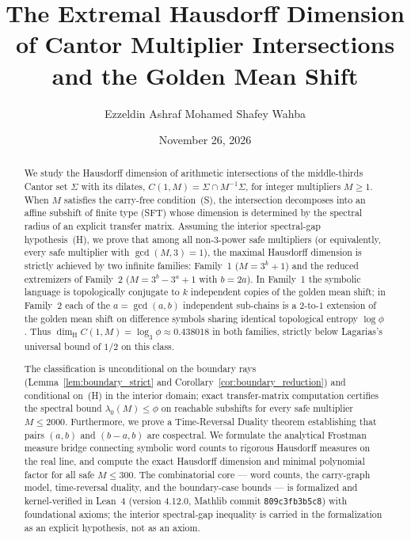 \documentclass[11pt,reqno]{amsart}
\title[Extremal Hausdorff Dimension of Cantor Multipliers]{The Extremal Hausdorff Dimension of Cantor Multiplier Intersections and the Golden Mean Shift}
\author{Ezzeldin Ashraf Mohamed Shafey Wahba}
\date{November 26, 2026}
\theoremstyle{plain}
\theoremstyle{definition}
\theoremstyle{remark}
\newcommand{\dimH}{\dim_{\mathrm{H}}}
\begin{document}
\begin{abstract}
We study the Hausdorff dimension of arithmetic intersections of the middle-thirds Cantor set $\Sigma$ with its dilates, $C(1, M) = \Sigma \cap M^{-1} \Sigma$, for integer multipliers $M \ge 1$. When $M$ satisfies the carry-free condition~(S), the intersection decomposes into an affine subshift of finite type (SFT) whose dimension is determined by the spectral radius of an explicit transfer matrix. Assuming the interior spectral-gap hypothesis~(H), we prove that among all non-$3$-power safe multipliers (or equivalently, every safe multiplier with $\gcd(M, 3) = 1$), the maximal Hausdorff dimension is strictly achieved by two infinite families: Family~1 ($M = 3^k + 1$) and the reduced extremizers of Family~2 ($M = 3^b - 3^a + 1$ with $b = 2a$). In Family~1 the symbolic language is topologically conjugate to $k$ independent copies of the golden mean shift; in Family~2 each of the $a = \gcd(a,b)$ independent sub-chains is a $2$-to-$1$ extension of the golden mean shift on difference symbols sharing identical topological entropy $\log \phi$. Thus $\dimH C(1, M) = \log_3 \phi \approx 0.438018$ in both families, strictly below Lagarias's universal bound of $1/2$ on this class.

The classification is unconditional on the boundary rays (Lemma~\ref{lem:boundary_strict} and Corollary~\ref{cor:boundary_reduction}) and conditional on~(H) in the interior domain; exact transfer-matrix computation certifies the spectral bound $\lambda_0(M) \le \phi$ on reachable subshifts for every safe multiplier $M \le 2000$. Furthermore, we prove a Time-Reversal Duality theorem establishing that pairs $(a, b)$ and $(b-a, b)$ are cospectral. We formulate the analytical Frostman measure bridge connecting symbolic word counts to rigorous Hausdorff measures on the real line, and compute the exact Hausdorff dimension and minimal polynomial factor for all safe $M \le 300$. The combinatorial core --- word counts, the carry-graph model, time-reversal duality, and the boundary-case bounds --- is formalized and kernel-verified in Lean~4 (version 4.12.0, Mathlib commit \texttt{809c3fb3b5c8}) with foundational axioms; the interior spectral-gap inequality is carried in the formalization as an explicit hypothesis, not as an axiom.
\end{abstract}

\maketitle
\clearpage
\end{document}
